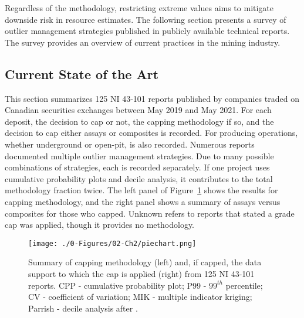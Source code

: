 
Regardless of the methodology, restricting extreme values aims to mitigate downside risk in resource estimates. The following section presents a survey of outlier management strategies published in publicly available technical reports. The survey provides an overview of current practices in the mining industry.

\FloatBarrier
\subsection{Current State of the Art}
\label{subsec:02state}

This section summarizes 125 \gls{NI} 43-101 reports published by companies traded on Canadian securities exchanges between May 2019 and May 2021. For each deposit, the decision to cap or not, the capping methodology if so, and the decision to cap either assays or composites is recorded. For producing operations, whether underground or open-pit, is also recorded. Numerous reports documented multiple outlier management strategies. Due to many possible combinations of strategies, each is recorded separately. If one project uses cumulative probability plots and decile analysis, it contributes to the total methodology fraction twice. The left panel of Figure~\ref{fig:piechart} shows the results for capping methodology, and the right panel shows a summary of assays versus composites for those who capped. Unknown refers to reports that stated a grade cap was applied, though it provides no methodology.

\begin{figure}[htb!]
    \centering
    \texttt{[image: ./0-Figures/02-Ch2/piechart.png]}
    \caption{Summary of capping methodology (left) and, if capped, the data support to which the cap is applied (right) from 125 \gls{NI} 43-101 reports. CPP - cumulative probability plot; P99 - $99^{th}$ percentile; CV - coefficient of variation; MIK - multiple indicator kriging; Parrish - decile analysis after \cite{parrish1997geologist}.}
    \label{fig:piechart}
\end{figure}

